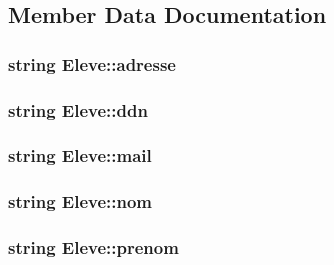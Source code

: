 \subsection{Member Data Documentation}
\hypertarget{class_eleve_a397780b74849d969b9095457dba8e1c1}{
\subsubsection[{adresse}]{\setlength{\rightskip}{0pt plus 5cm}string Eleve\+::adresse\hspace{0.3cm}{\ttfamily [private]}}}\label{class_eleve_a397780b74849d969b9095457dba8e1c1}
\hypertarget{class_eleve_af66f74f6f47e1d9d548f4ea583181050}{
\subsubsection[{ddn}]{\setlength{\rightskip}{0pt plus 5cm}string Eleve\+::ddn\hspace{0.3cm}{\ttfamily [private]}}}\label{class_eleve_af66f74f6f47e1d9d548f4ea583181050}
\hypertarget{class_eleve_a55582aa568fa4bbbb3f7d151e49e4709}{
\subsubsection[{mail}]{\setlength{\rightskip}{0pt plus 5cm}string Eleve\+::mail\hspace{0.3cm}{\ttfamily [private]}}}\label{class_eleve_a55582aa568fa4bbbb3f7d151e49e4709}
\hypertarget{class_eleve_a912b79db853e8dd2e0fd5c9f0fae1986}{
\subsubsection[{nom}]{\setlength{\rightskip}{0pt plus 5cm}string Eleve\+::nom\hspace{0.3cm}{\ttfamily [private]}}}\label{class_eleve_a912b79db853e8dd2e0fd5c9f0fae1986}
\hypertarget{class_eleve_a751fd312c37f99b67b13dccf3e017f00}{
\subsubsection[{prenom}]{\setlength{\rightskip}{0pt plus 5cm}string Eleve\+::prenom\hspace{0.3cm}{\ttfamily [private]}}}\label{class_eleve_a751fd312c37f99b67b13dccf3e017f00}
